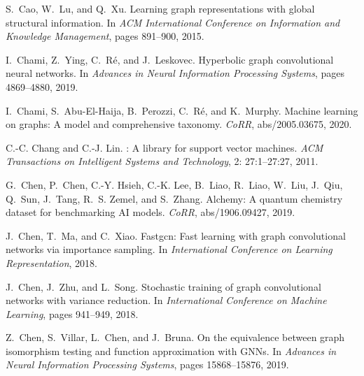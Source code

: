 \documentclass{article}
\theoremstyle{definition}
\begin{document}
\begin{thebibliography}{125}
	S.~Cao, W.~Lu, and Q.~Xu.
	 {L}earning graph representations with global structural
	information.
	\newblock In \emph{{ACM} International Conference on Information and Knowledge
		Management}, pages 891--900, 2015.
	
	I.~Chami, Z.~Ying, C.~R{\'{e}}, and J.~Leskovec.
	\newblock Hyperbolic graph convolutional neural networks.
	\newblock In \emph{Advances in Neural Information Processing Systems}, pages
	4869--4880, 2019.
	
	I.~Chami, S.~Abu{-}El{-}Haija, B.~Perozzi, C.~R{\'{e}}, and K.~Murphy.
	\newblock Machine learning on graphs: {A} model and comprehensive taxonomy.
	\newblock \emph{CoRR}, abs/2005.03675, 2020.
	
	C.-C. Chang and C.-J. Lin.
	: {A} library for support vector machines.
	\newblock \emph{ACM Transactions on Intelligent Systems and Technology},
	2: 27:1--27:27, 2011.
	
	G.~Chen, P.~Chen, C.{-}Y. Hsieh, C.{-}K. Lee, B.~Liao, R.~Liao, W.~Liu, J.~Qiu,
	Q.~Sun, J.~Tang, R.~S. Zemel, and S.~Zhang.
	\newblock Alchemy: {A} quantum chemistry dataset for benchmarking {AI} models.
	\newblock \emph{CoRR}, abs/1906.09427, 2019{}.
	
	J.~Chen, T.~Ma, and C.~Xiao.
	\newblock Fastgcn: Fast learning with graph convolutional networks via
	importance sampling.
	\newblock In \emph{International Conference on Learning Representation},
	2018{}.
	
	J.~Chen, J.~Zhu, and L.~Song.
	\newblock Stochastic training of graph convolutional networks with variance
	reduction.
	\newblock In \emph{International Conference on Machine Learning}, pages
	941--949, 2018{}.
	
	Z.~Chen, S.~Villar, L.~Chen, and J.~Bruna.
	\newblock On the equivalence between graph isomorphism testing and function
	approximation with {GNN}s.
	\newblock In \emph{Advances in Neural Information Processing Systems}, pages
	15868--15876, 2019{}.
	

\end{thebibliography}
\end{document}
